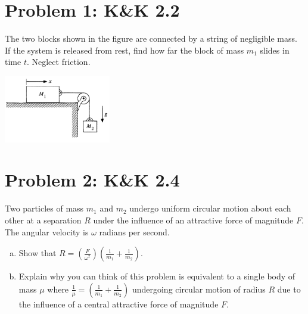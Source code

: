 \documentclass[problems]{esg8012pset}
\date{September 17}
\begin{document}
\section*{Problem 1: K\&K 2.2}
  The two blocks shown in the figure are connected by a string of negligible mass. If the system is released from rest, find how far the block of mass $m_1$ slides in time $t$. Neglect friction.
  \begin{center}\includegraphics[width=0.35\textwidth]{ps02_1}\end{center}
\section*{Problem 2: K\&K 2.4}
  Two particles of mass $m_1$ and $m_2$ undergo uniform circular motion about each other at a separation $R$ under the influence of an attractive force of magnitude $F$.  The angular velocity is $\omega$ radians per second.
  \begin{enumerate}[a)]
    \item Show that $R = \left(\frac{F}{\omega^2}\right)\left(\frac{1}{m_1} + \frac{1}{m_2}\right)$.
    \item Explain why you can think of this problem is equivalent to a single body of mass $\mu$ where $\frac{1}{\mu} = \left(\frac{1}{m_1} + \frac{1}{m_2}\right)$ undergoing circular motion of radius $R$ due to the influence of a central attractive force of magnitude $F$.
  \end{enumerate}
\end{document}
